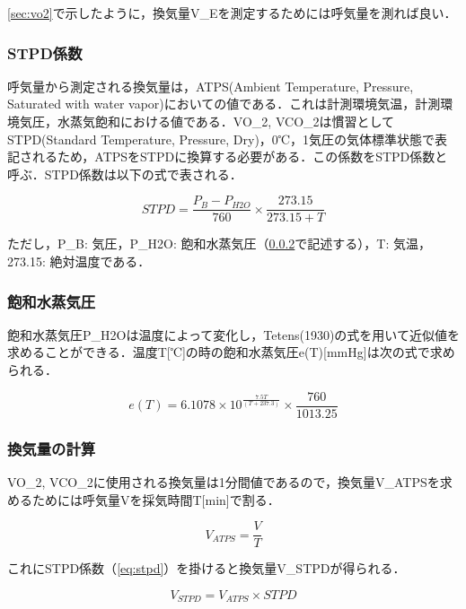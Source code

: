\ref{sec:vo2}で示したように，換気量V_Eを測定するためには呼気量を測れば良い．



\subsubsection{STPD係数}

呼気量から測定される換気量は，ATPS(Ambient Temperature, Pressure, Saturated with water vapor)においての値である．これは計測環境気温，計測環境気圧，水蒸気飽和における値である．VO_2, VCO_2は慣習としてSTPD(Standard Temperature, Pressure, Dry)，0℃，1気圧の気体標準状態で表記されるため，ATPSをSTPDに換算する必要がある．この係数をSTPD係数と呼ぶ．STPD係数は以下の式で表される．

\begin{equation}
  \label{eq:stpd}
  STPD = \frac{P_B - P_{H2O}}{760} \times　\frac{273.15}{273.15 + T}
\end{equation}

ただし，P_B: 気圧，P_{H2O}: 飽和水蒸気圧（\ref{sec:swvp}で記述する），T: 気温，273.15: 絶対温度である．

\subsubsection{飽和水蒸気圧}
\label{sec:swvp}

飽和水蒸気圧P_{H2O}は温度によって変化し，Tetens(1930)の式を用いて近似値を求めることができる．温度T[℃]の時の飽和水蒸気圧e(T)[mmHg]は次の式で求められる．

\begin{equation}
  e(T) = 6.1078 \times 10 ^ \frac{7.5T}{(T + 237.3)} \times \frac{760}{1013.25}
\end{equation}

\subsubsection{換気量の計算}

VO_2, VCO_2に使用される換気量は1分間値であるので，換気量V_{ATPS}を求めるためには呼気量Vを採気時間T[min]で割る．

\begin{equation}
  V_{ATPS} = \frac{V}{T}
\end{equation}

これにSTPD係数（\ref{eq:stpd}）を掛けると換気量V_{STPD}が得られる．

\begin{equation}
  V_{STPD} = V_{ATPS} \times STPD
\end{equation}


